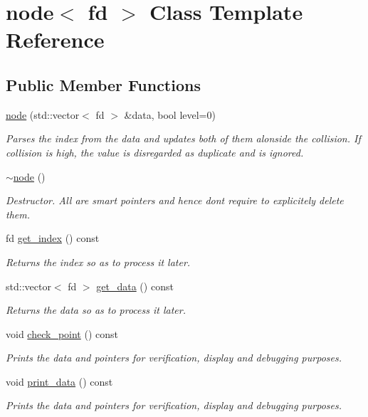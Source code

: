 \hypertarget{classnode}{}\section{node$<$ fd $>$ Class Template Reference}
\label{classnode}
\subsection*{Public Member Functions}
\begin{DoxyCompactItemize}
\item 
\hyperlink{classnode_abb2d5a39b7fcff742324019acaf42d2c}{node} (std\+::vector$<$ fd $>$ \&data, bool level=0)
\begin{DoxyCompactList}\small\item\em Parses the index from the data and updates both of them alonside the collision. If collision is high, the value is disregarded as duplicate and is ignored. \end{DoxyCompactList}\item 
\hyperlink{classnode_a55699ad13ccb948e07d3f1e9a1e084e4}{$\sim$node} ()
\begin{DoxyCompactList}\small\item\em Destructor. All are smart pointers and hence don\textquotesingle{}t require to explicitely delete them. \end{DoxyCompactList}\item 
fd \hyperlink{classnode_aa260eb75321b240e0a6a5acdbbfbd43e}{get\+\_\+index} () const
\begin{DoxyCompactList}\small\item\em Returns the index so as to process it later. \end{DoxyCompactList}\item 
std\+::vector$<$ fd $>$ \hyperlink{classnode_ae9a1d7bf456930b81bba739af8c9044c}{get\+\_\+data} () const
\begin{DoxyCompactList}\small\item\em Returns the data so as to process it later. \end{DoxyCompactList}\item 
void \hyperlink{classnode_a23e97fe46ab935948abbcd36f32cb50d}{check\+\_\+point} () const
\begin{DoxyCompactList}\small\item\em Prints the data and pointers for verification, display and debugging purposes. \end{DoxyCompactList}\item 
void \hyperlink{classnode_a7985a94a89f71279e7667354481c96f9}{print\+\_\+data} () const
\begin{DoxyCompactList}\small\item\em Prints the data and pointers for verification, display and debugging purposes. \end{DoxyCompactList}\end{DoxyCompactItemize}
